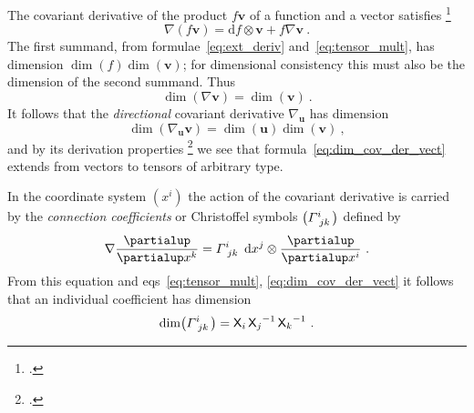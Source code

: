 \documentclass[\ifafour a4paper,12pt,\else a5paper,10pt,\fi%
onecolumn,oneside,article,%
british%
]{memoir}
\theoremstyle{remark}
\theoremstyle{innote}
\newcommand*{\citep}{\footcites}
\newcommand*{\de}{\partialup}%
\newcommand*{\di}{\mathrm{d}}%
\renewcommand*{\|}[1][]{\nonscript\,#1\vert\nonscript\;\mathopen{}}
\newcommand*{\sect}{\S}%
\newcommand*{\eqns}{eqs}%
\newcommand*{\Xx}{\textsf{X}}
\newcommand*{\yv}{\bm{v}}
\newcommand*{\yu}{\bm{u}}
\renewcommand*{\i}{\indices}
\newcommand*{\dex}[1][i]{\frac{\de}{\de x^{#1}}}
\newcommand*{\dix}[1][i]{\di x^{#1}}
\newcommand*{\nab}{\nabla}
\newcommand*{\yGa}{\varGamma}
\begin{document}
The covariant derivative of the product $f\yv$ of a function and a vector
satisfies \citep[\sect~V.B.1]{choquetbruhatetal1977_r1996}
\begin{equation}
  \label{eq:basic_property_covder}
  \nab(f\yv) = \di f \otimes \yv + f\nab\yv\ .
\end{equation}
The first summand, from formulae~\eqref{eq:ext_deriv}
and~\eqref{eq:tensor_mult}, has dimension $\dim(f)\dim(\yv)$; for
dimensional consistency this must also be the dimension of the second
summand. Thus
\begin{equation}
  \label{eq:dim_cov_der_vect}
  \dim(\nab\yv) = \dim(\yv)\ .
\end{equation}
It follows that the \emph{directional} covariant derivative $\nab_{\yu}$
has dimension
\begin{equation}
  \label{eq:dim_dircov_der_vect}
  \dim(\nab_{\yu}\yv) = \dim(\yu)\dim(\yv)\ ,
\end{equation}
and by its derivation properties \citep[\sect~V.B.1
p.~303]{choquetbruhatetal1977_r1996} we see that
formula~\eqref{eq:dim_cov_der_vect} extends from vectors to 
tensors of arbitrary type.

\medskip

In the coordinate system $(x^{i})$ the action of the covariant derivative
is carried by the \emph{connection coefficients} or Christoffel symbols
$\bigl(\yGa\i{^{i}_{jk}}\bigr)$ defined by
\begin{equation}
  \label{eq:christoffel}
  \nab\dex[k] = \yGa\i{^{i}_{jk}}\  \dix[j]\otimes\dex[i]\ .
\end{equation}
From this equation and \eqns~\eqref{eq:tensor_mult},
\eqref{eq:dim_cov_der_vect} it follows that an individual coefficient has
dimension
\begin{equation}
  \label{eq:dim_christoffel}
  \dim\bigl(\yGa\i{^{i}_{jk}}\bigr) = \Xx_{i}\, {\Xx_{j}}^{-1}\,{\Xx_{k}}^{-1}\ .
\end{equation}

\medskip
\end{document}
